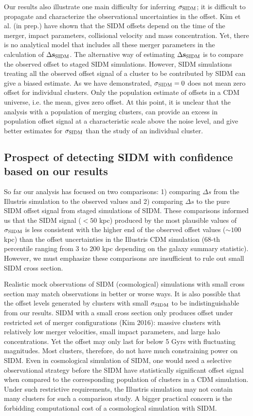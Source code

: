 Our results also illustrate one main difficulty for inferring $\sigma_{\rm SIDM}$; 
it is difficult to propagate and characterize the observational 
uncertainties in the offset. Kim et al. (in prep.) have shown 
that the SIDM offsets depend on the time of the 
merger, impact parameters, collisional velocity and mass concentration. 
Yet, there is no analytical model that includes all these merger
parameters in the calculation of $\Delta {\bf s}_{{\rm SIDM}}$.  
The alternative way of estimating $\Delta {\bf s}_{{\rm SIDM}}$ is to compare the observed
offset to staged SIDM simulations.
However, SIDM simulations treating all the observed offset signal of a cluster 
to be contributed by SIDM can give a biased estimate.  
As we have demonstrated, $\sigma_{\rm SIDM} = 0$ does not mean zero offset for
individual clusters.  
Only the population estimate of offsets in a CDM universe, i.e. the mean,
gives zero offset.  
At this point, it is unclear that the analysis with a population of
merging clusters, can provide an excess in population offset signal at a
characteristic scale above the noise level, and give 
better estimates for $\sigma_{\rm
SIDM}$ than the study of an individual cluster.  


\subsection{Prospect of detecting SIDM with confidence based on our results} 
\label{subsec:limitation_of_pvalue}
  
So far our analysis has focused on two comparisons: 1) comparing $\Delta s$ from
the Illustris simulation to the observed values and 2) comparing $\Delta s$ to  
the pure SIDM offset signal from staged simulations of SIDM. 
These comparisons informed us that the SIDM signal ($< 50$ kpc) produced by the
most plausible values of 
$\sigma_{\rm SIDM}$ is less consistent with the higher end of the observed offset values ($\sim
100$ kpc) than the offset uncertainties in the Illustris CDM simulation (68-th 
percentile ranging from 3 to 200 kpc depending on the galaxy summary statistic).
However, we must emphasize these comparisons are
insufficient to rule out small SIDM cross section.  

Realistic mock observations of SIDM (cosmological) simulations 
with small cross section may match observations in better or worse ways. 
It is also possible that the offset levels generated by clusters with small
$\sigma_{\rm SIDM}$ 
to be indistinguishable from our results. 
SIDM with a small cross section only produces offset under restricted set of 
merger configurations (Kim  2016): 
massive clusters with relatively low merger velocities, small impact
parameters, and large halo concentrations. Yet the offset may only last
for below 5 Gyrs with fluctuating magnitudes.  
Most clusters, therefore, do not have much constraining power on SIDM.
Even in cosmological simulation of SIDM, one would need a selective observational strategy
before the SIDM have statistically significant offset signal when compared 
to the corresponding population of clusters in a CDM simulation. 
Under such restrictive requirements, the Illustris simulation may not contain 
many clusters for such a comparison study.  A bigger practical
concern is the forbidding computational cost of a cosmological simulation with SIDM.
 
